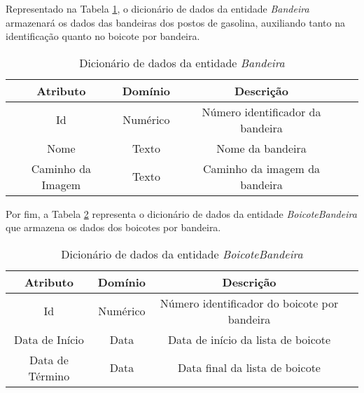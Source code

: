 Representado na Tabela \ref{dic:flag}, o dicionário de dados da entidade \textit{Bandeira} armazenará os dados das bandeiras dos postos de gasolina, auxiliando tanto na identificação quanto no boicote por bandeira.

\begin{table}[H]
\centering
\caption{Dicionário de dados da entidade \textit{Bandeira}}
\label{dic:flag}
\begin{tabular}{|c|c|c|c|}\hline
\textbf{Atributo} & \textbf{Domínio} & \textbf{Descrição}   \\ \hline
Id                            & Numérico                                                       & Número identificador da bandeira \\ \hline
Nome                      & Texto                                           & Nome da bandeira \\ \hline
Caminho da Imagem                       & Texto                                           & Caminho da imagem da bandeira\\ \hline

\end{tabular}
\end{table}

Por fim, a Tabela \ref{dic:flag_boycott} representa o dicionário de dados da entidade \textit{BoicoteBandeira} que armazena os dados dos boicotes por bandeira.

\begin{table}[H]
\centering
\caption{Dicionário de dados da entidade \textit{BoicoteBandeira}}
\label{dic:flag_boycott}
\begin{tabular}{|c|c|c|c|}\hline
\textbf{Atributo} & \textbf{Domínio}  & \textbf{Descrição}   \\ \hline
Id                            & Numérico                                                       & Número identificador do boicote por bandeira \\ \hline
Data de Início                      & Data                                           & Data de início da lista de boicote \\ \hline
Data de Término                       & Data                                         & Data final da lista de boicote\\ \hline

\end{tabular}
\end{table}
